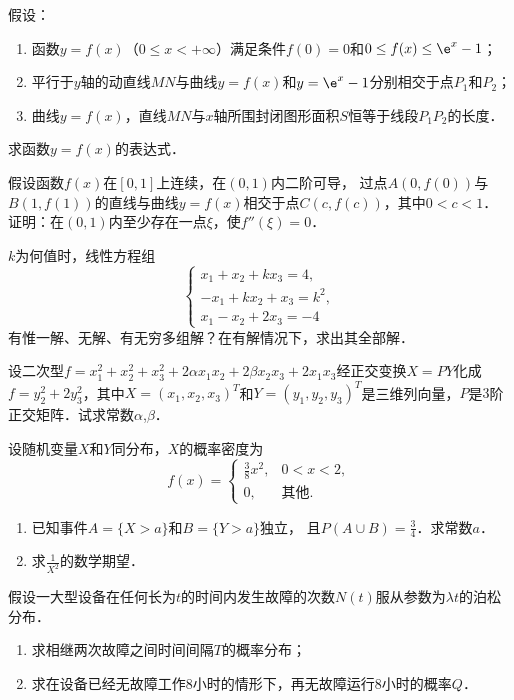 \documentclass[plain,noanswer,medmath]{../../template/jnuexam}
\begin{document}

\begin{problem}
假设：
\begin{enumerate}
\item 函数$y = f(x)$（$0 \le x < +\infty$）满足条件$f(0) = 0$和$0 \le f(x) \le \e^x - 1$；
\item 平行于$y$轴的动直线$MN$与曲线$y = f(x)$和$y = \e^x - 1$分别相交于点$P_1$和$P_2$；
\item 曲线$y = f(x)$，直线$MN$与$x$轴所围封闭图形面积$S$恒等于线段$P_1P_2$的长度．
\end{enumerate}
求函数$y = f(x)$的表达式．
\end{problem}



\begin{problem}
假设函数$f(x)$在$[0,1]$上连续，在$(0,1)$内二阶可导，
过点$A(0,f(0))$与$B(1,f(1))$的直线与曲线$y = f(x)$相交于点$C(c,f(c))$，其中$0 < c < 1$．
证明：在$(0,1)$内至少存在一点$\xi$，使$f''(\xi) = 0$．
\end{problem}



\begin{problem}
$k$为何值时，线性方程组
$$\begin{cases}
  x_1 + x_2 + kx_3 = 4, \\
  -x_1 + kx_2 + x_3 = k^2, \\
  x_1 - x_2 + 2x_3 = - 4
\end{cases}$$
有惟一解、无解、有无穷多组解？在有解情况下，求出其全部解．
\end{problem}



\begin{problem}
设二次型$f = x_1^2+ x_2^2+ x_3^2+ 2\alpha x_1x_2 + 2\beta x_2x_3 + 2x_1x_3$经正交变换$X = PY$化成$f = y_2^2+ 2y_3^2$，其中$X = (x_1,x_2,x_3)^T$和$Y = (y_1,y_2,y_3)^T$是三维列向量，$P$是$3$阶正交矩阵．试求常数$\alpha$,$\beta$．
\end{problem}



\begin{problem}
设随机变量$X$和$Y$同分布，$X$的概率密度为
$$f(x) = \begin{cases}
  \frac{3}{8}x^2, & 0 < x < 2, \\
               0, & \text{其他}.
\end{cases}$$
\begin{enumerate}
\item 已知事件$A = \{X > a\}$和$B = \{Y > a\}$独立，
      且$P\left(A \cup B \right) = \frac{3}{4}$．求常数$a$．
\item 求$\frac{1}{X^2}$的数学期望．
\end{enumerate}
\end{problem}



\begin{problem}
假设一大型设备在任何长为$t$的时间内发生故障的次数$N(t)$服从参数为$\lambda t$的泊松分布．
\begin{enumerate}
\item 求相继两次故障之间时间间隔$T$的概率分布；
\item 求在设备已经无故障工作$8$小时的情形下，再无故障运行$8$小时的概率$Q$．
\end{enumerate}
\end{problem}
\end{document}
